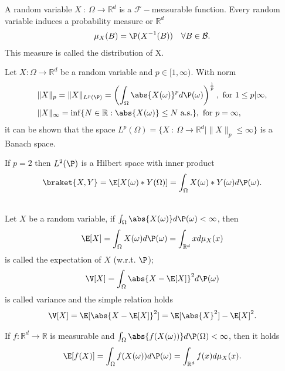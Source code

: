 \vskip5mm
\begin{definition}
 A random variable $X \ : \ \Omega  \to \mathbb{R}^{d} $  is a $\mathcal{F}-$measurable function.
 Every random variable induces a probability measure or $\mathbb{R}^{d} $ 
 \begin{align*}
  \mu_X(B) = \P(X^{-1}(B) ) \quad \forall B \in  \mathcal{B}
 .\end{align*}
This measure is called the distribution of X.
\end{definition}
\begin{remark}[$L^p$ spaces]
	Let $X : \Omega  \to  \mathbb{R}^{d} $  be a random variable and $p \in [1,\infty)$.
 With norm 
\begin{align*}
&\|X\|_p = \|X\|_{L^{p}(\P ) } = \left( \int_{\Omega} \abs{X(\omega )}^{p} d\P(\omega )  \right)^{\frac{1}{p}} , \mbox{ for } 1\leq p|\infty,\\
&\|X\|_{\infty} = \inf \{N \in  \mathbb{R} : \abs{X(\omega )} \le  N \text{ a.s.}\}  ,\mbox{ for } p=\infty
,\end{align*}
it can be shown that the space $ L^{p}(\Omega ) = \{X \ : \ \Omega  \to  \mathbb{R}^{d}   |  \|X\|_p \le \infty \}    $ is a Banach space.
\end{remark}
\begin{remark}
	If $p=2$ then $L^{2}(\P) $ is a Hilbert space with inner product 
	\begin{align*}
	\braket{X,Y} = \E[X(\omega )*Y(\Omega )] = \int_{\Omega }X(\omega )*Y(\omega )d\P(\omega )
	.\end{align*}
\end{remark}
\begin{definition}\hspace{1cm}\\
 Let $X$ be a random variable, if 
$  \int_{\Omega } \abs{X(\omega )}d\P(\omega ) < \infty$,
 then 
 \begin{align*}
   \E[X] = \int_{\Omega } X(\omega ) d\P(\omega ) =  \int_{\mathbb{R}^{d} }x d\mu_X(x)
 \end{align*}
 is called the expectation of $X$ (w.r.t. $\P$);
 \begin{align*}
   \V[X] = \int_{\Omega } \abs{X - \E[X]}^2 d\P(\omega )
 \end{align*}
 is called variance and the simple relation holds
 \begin{align*}
   \V[X] = \E[\abs{X-\E[X]}^2] = \E[\abs{X}^2] - \E[X]^2
 .\end{align*}
\end{definition}
\begin{remark}
 If $f : \mathbb{R}^{d} \to  \mathbb{R} $ is measurable and $ \int_{\Omega } \abs{f(X(\omega ))} d\P(\Omega ) <\infty$, 
 then it holds
 \begin{align*}
   \E[f(X)] = \int_{\Omega }f(X(\omega ))d\P(\omega ) = \int_{\mathbb{R}^{d} }f(x) d\mu_X(x)
 .\end{align*}
\end{remark}

